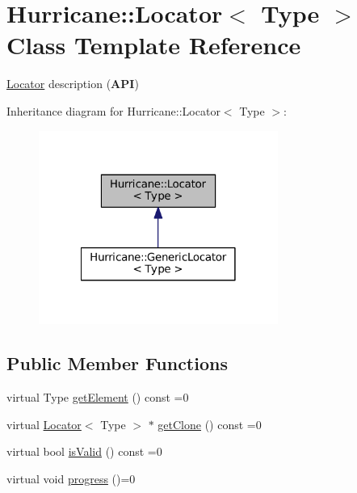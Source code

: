 \hypertarget{classHurricane_1_1Locator}{}\section{Hurricane\+:\+:Locator$<$ Type $>$ Class Template Reference}
\label{classHurricane_1_1Locator}


\mbox{\hyperlink{classHurricane_1_1Locator}{Locator}} description ({\bfseries A\+PI})  




Inheritance diagram for Hurricane\+:\+:Locator$<$ Type $>$\+:\nopagebreak
\begin{figure}[H]
\begin{center}
\leavevmode
\includegraphics[width=222pt]{classHurricane_1_1Locator__inherit__graph}
\end{center}
\end{figure}
\subsection*{Public Member Functions}
\begin{DoxyCompactItemize}
\item 
virtual Type \mbox{\hyperlink{classHurricane_1_1Locator_aa2202b4cf461a7c3b666da10bc96219f}{get\+Element}} () const =0
\item 
virtual \mbox{\hyperlink{classHurricane_1_1Locator}{Locator}}$<$ Type $>$ $\ast$ \mbox{\hyperlink{classHurricane_1_1Locator_a83779aa300e3de011bf3b93be8a48d83}{get\+Clone}} () const =0
\item 
virtual bool \mbox{\hyperlink{classHurricane_1_1Locator_abb6e5255372e22e31bf0a8e4cae93f87}{is\+Valid}} () const =0
\item 
virtual void \mbox{\hyperlink{classHurricane_1_1Locator_ad8d72c1625a343a50520792c96fa1ca1}{progress}} ()=0
\end{DoxyCompactItemize}



